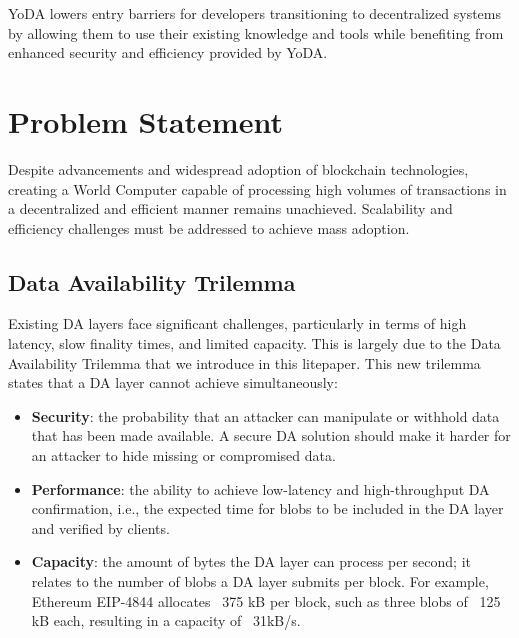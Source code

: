 \documentclass[11pt]{article}
\begin{document}
\smallskip
YoDA lowers entry barriers for developers transitioning to decentralized systems by allowing them to use their existing knowledge and tools while benefiting from enhanced security and efficiency provided by YoDA.

\section{Problem Statement}
Despite advancements and widespread adoption of blockchain technologies, creating a World Computer capable of processing high volumes of transactions in a decentralized and efficient manner remains unachieved. Scalability and efficiency challenges must be addressed to achieve mass adoption.

\subsection{Data Availability Trilemma}
Existing DA layers face significant challenges, particularly in terms of high latency, slow finality times, and limited capacity. This is largely due to the Data Availability Trilemma that we introduce in this litepaper. This new trilemma states that a DA layer cannot achieve simultaneously:
\begin{itemize}
    \item \textbf{Security}: the probability that an attacker can manipulate or withhold data that has been made available. A secure DA solution should make it harder for an attacker to hide missing or compromised data.
    \item \textbf{Performance}: the ability to achieve low-latency and high-throughput DA confirmation, i.e., the expected time for blobs to be included in the DA layer and verified by clients.
    \item \textbf{Capacity}: the amount of bytes the DA layer can process per second; it relates to the number of blobs a DA layer submits per block. For example, Ethereum EIP-4844 allocates ~375 kB per block, such as three blobs of ~125 kB each, resulting in a capacity of ~31kB/s.
\end{itemize}
\end{document}
